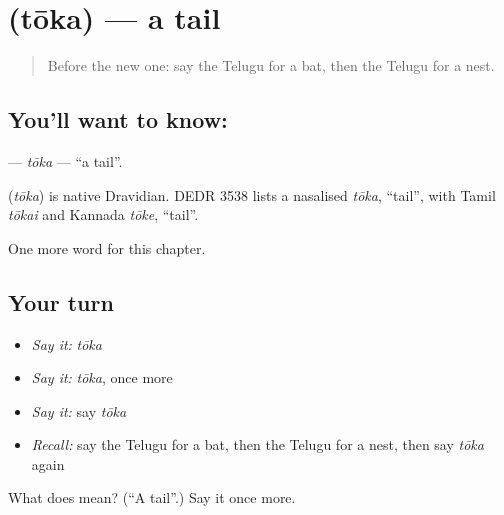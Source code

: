 \section[\texorpdfstring{\te{తోక} (tōka)}{తోక (tōka)}]{ (tōka) — a tail}

\label{lesson:TE-C228-toka}



\begin{quote}
Before the new one: say the Telugu for a bat, then the Telugu for a nest.
\end{quote}

\subsection*{You'll want to know: }
\textbf{} — \emph{tōka} — \textquotedblleft{}a tail\textquotedblright{}.

\begin{cousinweb}
\textbf{} (\emph{tōka}) is native Dravidian. DEDR 3538 lists a nasalised \emph{tōka}, \textquotedblleft{}tail\textquotedblright{}, with Tamil \emph{tōkai} and Kannada \emph{tōke}, \textquotedblleft{}tail\textquotedblright{}.
\end{cousinweb}

\begin{grammarlens}[title={What you've built}]
One more word for this chapter.
\end{grammarlens}

\subsection*{Your turn}
\begin{itemize}
\raggedright
  \item \emph{Say it:} \emph{tōka}
  \item \emph{Say it:} \emph{tōka}, once more
  \item \emph{Say it:} say \emph{tōka}
  \item \emph{Recall:} say the Telugu for a bat, then the Telugu for a nest, then say \emph{tōka} again
\end{itemize}

\begin{tcolorbox}[breakable,colback=teal!4,colframe=teal!35!black,title={Before you move on}]
What does  mean? (\textquotedblleft{}A tail\textquotedblright{}.) Say it once more.
\end{tcolorbox}
